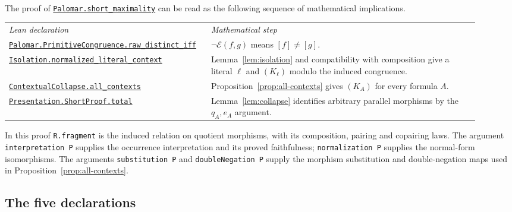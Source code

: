 \documentclass[11pt]{article}
\begin{document}
The proof of \href{https://github.com/flengyel/Dosen-Petric-Maximality/blob/5dbee39bea09539bd130f729e82636419f71f920/DosenPetric/PalomarMaximality.lean\#L27}{\texttt{Palomar.short\_maximality}} can be read as
the following sequence of mathematical implications.
\begin{center}
\small
\begin{tabular}{>{\raggedright\arraybackslash}p{0.37\linewidth}>{\raggedright\arraybackslash}p{0.55\linewidth}}
\textit{Lean declaration} & \textit{Mathematical step}\\[3pt]
\href{https://github.com/flengyel/Dosen-Petric-Maximality/blob/5dbee39bea09539bd130f729e82636419f71f920/DosenPetric/PalomarCorrespondence.lean\#L121}{\texttt{Palomar.PrimitiveCongruence.\allowbreak{}raw\_distinct\_iff}}
 & $\neg\mathcal E(f,g)$ means $[f]\ne[g]$.\\[5pt]
\href{https://github.com/flengyel/Dosen-Petric-Maximality/blob/5dbee39bea09539bd130f729e82636419f71f920/DosenPetric/Isolation.lean\#L219}{\texttt{Isolation.\allowbreak{}normalized\_literal\_context}}
 & Lemma~\ref{lem:isolation} and compatibility with composition give a literal $\ell$ and $(K_\ell)$
   modulo the induced congruence.\\[5pt]
\href{https://github.com/flengyel/Dosen-Petric-Maximality/blob/5dbee39bea09539bd130f729e82636419f71f920/DosenPetric/Substitution.lean\#L90}{\texttt{ContextualCollapse.\allowbreak{}all\_contexts}}
 & Proposition~\ref{prop:all-contexts} gives $(K_A)$ for every formula $A$.\\[5pt]
\href{https://github.com/flengyel/Dosen-Petric-Maximality/blob/5dbee39bea09539bd130f729e82636419f71f920/DosenPetric/PresentationShortProjection.lean\#L86}{\texttt{Presentation.ShortProof.\allowbreak{}total}}
 & Lemma~\ref{lem:collapse} identifies arbitrary parallel morphisms by
   the $q_A,e_A$ argument.
\end{tabular}
\end{center}
In this proof \texttt{R.fragment} is the induced relation on
quotient morphisms, with its composition, pairing and copairing
laws. The argument \texttt{interpretation P} supplies the
occurrence interpretation and its proved faithfulness;
\texttt{normalization P} supplies the normal-form isomorphisms.
The arguments \texttt{substitution P} and
\texttt{doubleNegation P} supply the morphism substitution and
double-negation maps used in Proposition~\ref{prop:all-contexts}.

\subsection{The five declarations}
\end{document}
